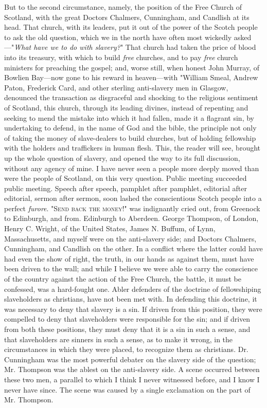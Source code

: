 But to the second circumstance, namely, the position of the Free Church
of Scotland, with the great Doctors Chalmers, Cunningham, and Candlish
at its head. That church, with its leaders, put it out of the power of
the Scotch people to ask the old question, which we in the north have
often most wickedly asked---"\emph{What have we to do with slavery?}"
That church had taken the price of blood into its treasury, with which
to build \emph{free} churches, and to pay \emph{free} church ministers
for preaching the gospel; and, worse still, when honest John Murray, of
Bowlien Bay---now gone to his reward in heaven---with "William Smeal,
Andrew Paton, Frederick Card, and other sterling anti-slavery men in
Glasgow, denounced the transaction as disgraceful and shocking to the
religious sentiment of Scotland, this church, through its leading
divines, instead of repenting and seeking to mend the mistake into which
it had fallen, made {\protect\hypertarget{382}{}{}}it a flagrant sin, by
undertaking to defend, in the name of God and the bible, the principle
not only of taking the money of slave-dealers to build churches, but of
holding fellowship with the holders and traffickers in human flesh.
This, the reader will see, brought up the whole question of slavery, and
opened the way to its full discussion, without any agency of mine. I
have never seen a people more deeply moved than were the people of
Scotland, on this very question. Public meeting succeeded public
meeting. Speech after speech, pamphlet after pamphlet, editorial after
editorial, sermon after sermon, soon lashed the conscientious Scotch
people into a perfect \emph{furore}. "\textsc{Send back the money}!" was
indignantly cried out, from Greenock to Edinburgh, and from. Edinburgh
to Aberdeen. George Thompson, of London, Henry C. Wright, of the United
States, James N. Buffum, of Lynn, Massachusetts, and myself were on the
anti-slavery side; and Doctors Chalmers, Cunningham, and Candlish on the
other. In a conflict where the latter could have had even the show of
right, the truth, in our hands as against them, must have been driven to
the wall; and while I believe we were able to carry the conscience of
the country against the action of the Free Church, the battle, it must
be confessed, was a hard-fought one. Abler defenders of the doctrine of
fellowshiping slaveholders as christians, have not been met with. In
defending this doctrine, it was necessary to deny that slavery is a sin.
If driven from this position, they were compelled to deny that
slaveholders were responsible for the sin; and if driven from both these
{\protect\hypertarget{383}{}{}}positions, they must deny that it is a
sin in such a sense, and that slaveholders are sinners in such a sense,
as to make it wrong, in the circumstances in which they were placed, to
recognize them as christians. Dr. Cunningham was the most powerful
debater on the slavery side of the question; Mr. Thompson was the ablest
on the anti-slavery side. A scene occurred between these two men, a
parallel to which I think I never witnessed before, and I know I never
have since. The scene was caused by a single exclamation on the part of
Mr. Thompson.

